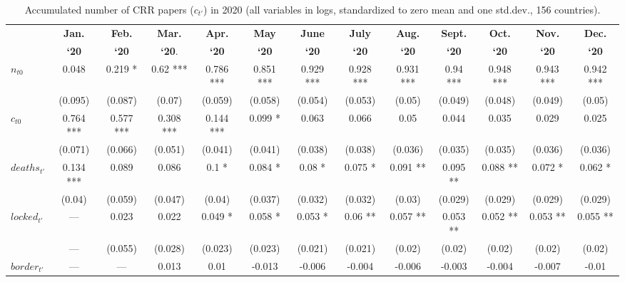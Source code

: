 {
\begin{landscape}
\begin{table}
	\begin{threeparttable}
\centering
\caption{Accumulated number of CRR papers ($c_{t'}$) in 2020 (all variables in logs, standardized to zero mean and one std.dev., 156 countries).}
\label{tab:NationalCRR}
\begin{small}
\begin{tabular}{lcccccccccccc}
\hline\noalign{\smallskip}
  & {\bf Jan.} & {\bf Feb.} & {\bf Mar.} & {\bf Apr.} &  {\bf May} &  {\bf June} &  {\bf July} &   {\bf Aug.} &  {\bf Sept.} &  {\bf Oct.} &  {\bf Nov.} &  {\bf Dec.} \\ 
  & {\bf`20}   & {\bf`20}     & {\bf`20}.    & {\bf`20}  & {\bf`20}   & {\bf`20}     & {\bf`20} & {\bf`20} & {\bf`20} & {\bf`20} & {\bf`20} & {\bf`20}  \\
\noalign{\smallskip}\hline\noalign{\smallskip}
   $n_{t0}$ & 0.048   & 0.219 *  & 0.62 ***  & 0.786 ***  & 0.851 ***  & 0.929 ***  & 0.928 ***  & 0.931 ***  & 0.94 ***  & 0.948 ***  & 0.943 ***  & 0.942 ***  \\ 
   & (0.095) & (0.087) & (0.07) & (0.059) & (0.058) & (0.054) & (0.053) & (0.05) & (0.049) & (0.048) & (0.049) & (0.05) \\ 
  $c_{t0}$ & 0.764 ***  & 0.577 ***  & 0.308 ***  & 0.144 ***  & 0.099 *  & 0.063   & 0.066   & 0.05   & 0.044   & 0.035   & 0.029   & 0.025   \\ 
   & (0.071) & (0.066) & (0.051) & (0.041) & (0.041) & (0.038) & (0.038) & (0.036) & (0.035) & (0.035) & (0.036) & (0.036) \\ 
  $deaths_{t'}$ & 0.134 ***  & 0.089   & 0.086   & 0.1 *  & 0.084 *  & 0.08 *  & 0.075 *  & 0.091 **  & 0.095 **  & 0.088 **  & 0.072 *  & 0.062 *  \\ 
   & (0.04) & (0.059) & (0.047) & (0.04) & (0.037) & (0.032) & (0.032) & (0.03) & (0.029) & (0.029) & (0.029) & (0.029) \\ 
  $locked_{t'}$ & --- & 0.023   & 0.022   & 0.049 *  & 0.058 *  & 0.053 *  & 0.06 **  & 0.057 **  & 0.053 **  & 0.052 **  & 0.053 **  & 0.055 **  \\ 
   & --- & (0.055) & (0.028) & (0.023) & (0.023) & (0.021) & (0.021) & (0.02) & (0.02) & (0.02) & (0.02) & (0.02) \\ 
  $border_{t'}$ & --- & --- & 0.013   & 0.01   & -0.013   & -0.006   & -0.004   & -0.006   & -0.003   & -0.004   & -0.007   & -0.01   \\ 

\end{tabular}
\end{small}
\end{threeparttable}
\end{table}
\end{landscape}}
